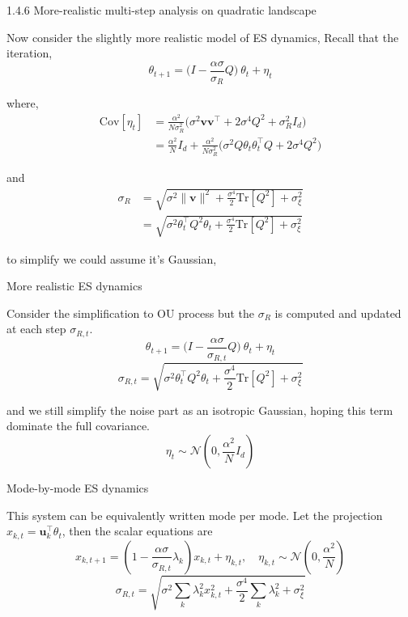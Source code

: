 1.4.6 More-realistic multi-step analysis on quadratic landscape

Now consider the slightly more realistic model of ES dynamics, Recall that the iteration,
\begin{equation}
\theta_{t+1}=\Big(I-\frac{\alpha\sigma}{\sigma_{R}}Q\Big)\ \theta_{t}+\eta_{t}
\end{equation}

where,
\begin{align}
\mathrm{Cov}[\eta_{t}]	&=\frac{\alpha^{2}}{N\sigma_{R}^{2}}\Big(\sigma^{2}\mathbf{v}\mathbf{v}^{\top}+2\sigma^{4}Q^{2}+\sigma_{R}^{2}I_{d}\Big) \\
	&=\frac{\alpha^{2}}{N}I_{d}+\frac{\alpha^{2}}{N\sigma_{R}^{2}}\Big(\sigma^{2}Q\theta_{t}\theta_{t}^{\top}Q+2\sigma^{4}Q^{2}\Big)
\end{align}

and
\begin{align}
\sigma_{R}	&=\sqrt{\sigma^{2}\|\mathbf{v}\|^{2}+\frac{\sigma^{4}}{2}\mathrm{Tr}[Q^{2}]+\sigma_{\xi}^{2}} \\
	&=\sqrt{\sigma^{2}\theta_{t}^{\top}Q^{2}\theta_{t}+\frac{\sigma^{4}}{2}\mathrm{Tr}[Q^{2}]+\sigma_{\xi}^{2}}
\end{align}

to simplify we could assume it's Gaussian,

More realistic ES dynamics

Consider the simplification to OU process but the $\sigma_{R}$ is computed and updated at each step $\sigma_{R,t}$.
\begin{equation}
\theta_{t+1}=\Big(I-\frac{\alpha\sigma}{\sigma_{R,t}}Q\Big)\ \theta_{t}+\eta_{t}
\end{equation}
\begin{equation}
\sigma_{R,t}=\sqrt{\sigma^{2}\theta_{t}^{\top}Q^{2}\theta_{t}+\frac{\sigma^{4}}{2}\mathrm{Tr}[Q^{2}]+\sigma_{\xi}^{2}}
\end{equation}

and we still simplify the noise part as an isotropic Gaussian, hoping this term dominate the full covariance.
\begin{equation}
\eta_{t}\sim\mathcal{N}(0,\frac{\alpha^{2}}{N}I_{d})
\end{equation}

Mode-by-mode ES dynamics

This system can be equivalently written mode per mode. Let the projection $x_{k,t}=\mathbf{u}_{k}^{\top}\theta_{t}$, then the scalar equations are
\begin{equation}
x_{k,t+1}=(1-\frac{\alpha\sigma}{\sigma_{R,t}}\lambda_{k})x_{k,t}+\eta_{k,t},\quad\eta_{k,t}\sim\mathcal{N}(0,\frac{\alpha^{2}}{N})
\end{equation}
\begin{equation}
\sigma_{R,t}=\sqrt{\sigma^{2}\sum_{k}\lambda_{k}^{2}x_{k,t}^{2}+\frac{\sigma^{4}}{2}\sum_{k}\lambda_{k}^{2}+\sigma_{\xi}^{2}}
\end{equation}

